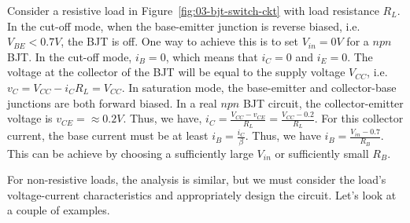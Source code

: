Consider a resistive load in Figure~\ref{fig:03-bjt-switch-ckt} with load resistance $R_L$. In the cut-off mode, when the base-emitter junction is reverse biased, i.e. $V_{BE} < 0.7V$, the BJT is off. One way to achieve this is to set $V_{in} = 0V$ for a $npn$ BJT. In the cut-off mode, $i_B = 0$, which means that $i_C = 0$ and $i_E = 0$. The voltage at the collector of the BJT will be equal to the supply voltage $V_{CC}$, i.e. $v_C = V_{CC} - i_C R_L = V_{CC}$. In saturation mode, the base-emitter and collector-base junctions are both forward biased. In a real $npn$ BJT circuit, the collector-emitter voltage is $v_{CE} = \approx 0.2V$. Thus, we have, $i_C = \frac{V_{CC} - v_{CE}}{R_L} = \frac{V_{CC} - 0.2}{R_L}$. For this collector current, the base current must be at least $i_B = \frac{i_C}{\beta}$. Thus, we have $i_B = \frac{V_{in} - 0.7}{R_B}$. This can be achieve by choosing a sufficiently large $V_{in}$ or sufficiently small $R_B$.

For non-resistive loads, the analysis is similar, but we must consider the load's voltage-current characteristics and appropriately design the circuit. Let's look at a couple of examples.

